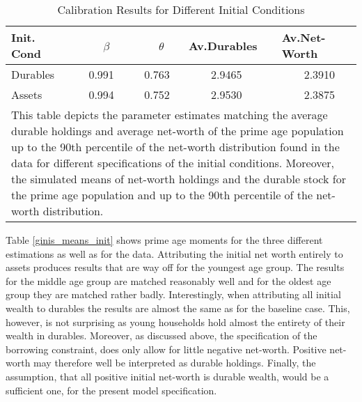 \documentclass[a4paper,12pt,legno]{article}
\begin{document}
\begin{table}[!htbp]
\centering
\caption{Calibration Results for Different Initial Conditions}
\label{estimates_initial_cond}
\begin{tabular}{llllll}
\hline
\multicolumn{2}{l}{Init. Cond} & \ \ \ \ $\beta$ & \ \ \ \ $\theta$ & Av.Durables & Av.Net-Worth\\ \hline
\multicolumn{2}{l}{Durables}             & \ \ 0.991    & \ \ 0.763  & \ \ \ \ 2.9465 & \ \ \ \ 2.3910      \\
\multicolumn{2}{l}{Assets}            & \ \ 0.994   & \ \ 0.752   & \ \ \ \ 2.9530 & \ \ \ \ 2.3875\\ \bottomrule
\multicolumn{6}{l}{%
  \begin{minipage}{11.5cm}%
    \small This table depicts the parameter estimates matching the average durable holdings and average net-worth of the prime age population up to the 90th percentile of the net-worth distribution found in the data for different specifications of the initial conditions. Moreover, the simulated means of net-worth holdings and the durable stock for the prime age population and up to the 90th percentile of the net-worth distribution.
  \end{minipage}%
}\\    
\end{tabular}
\end{table}

Table \ref{ginis_means_init} shows prime age moments for the three different estimations as well as for the data. Attributing the initial net worth entirely to assets produces results that are way off for the youngest age group. The results for the middle age group are matched reasonably well and for the oldest age group they are matched rather badly. Interestingly, when attributing all initial wealth to durables the results are almost the same as for the baseline case. This, however, is not surprising as young households hold almost the entirety of their wealth in durables. Moreover, as discussed above, the specification of the borrowing constraint, does only allow for little negative net-worth. Positive net-worth may therefore well be interpreted as durable holdings. Finally, the assumption, that all positive initial net-worth is durable wealth, would be a sufficient one, for the present model specification. 
\end{document}
